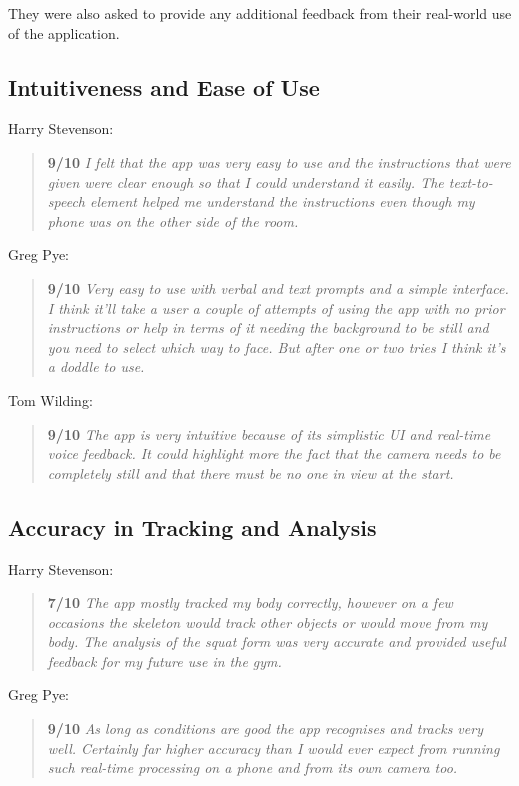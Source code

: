 They were also asked to provide any additional feedback from their real-world use of the application.

\pagebreak
\subsection{Intuitiveness and Ease of Use}

Harry Stevenson:
\begin{quote}
\textbf{9/10} \emph{I felt that the app was very easy to use and the instructions that were given were clear enough so that I could understand it easily. The text-to-speech element helped me understand the instructions even though my phone was on the other side of the room.}
\end{quote}

Greg Pye:
\begin{quote}
\textbf{9/10} \emph{Very easy to use with verbal and text prompts and a simple interface. I think it'll take a user a couple of attempts of using the app with no prior instructions or help in terms of it needing the background to be still and you need to select which way to face. But after one or two tries I think it's a doddle to use.}
\end{quote}

Tom Wilding:
\begin{quote}
\textbf{9/10} \emph{The app is very intuitive because of its simplistic UI and real-time voice feedback. It could highlight more the fact that the camera needs to be completely still and that there must be no one in view at the start.}
\end{quote}

\subsection{Accuracy in Tracking and Analysis}

Harry Stevenson:
\begin{quote}
\textbf{7/10} \emph{The app mostly tracked my body correctly, however on a few occasions the skeleton would track other objects or would move from my body. The analysis of the squat form was very accurate and provided useful feedback for my future use in the gym.}
\end{quote}

Greg Pye:
\begin{quote}
\textbf{9/10} \emph{As long as conditions are good the app recognises and tracks very well. Certainly far higher accuracy than I would ever expect from running such real-time processing on a phone and from its own camera too.}
\end{quote}


